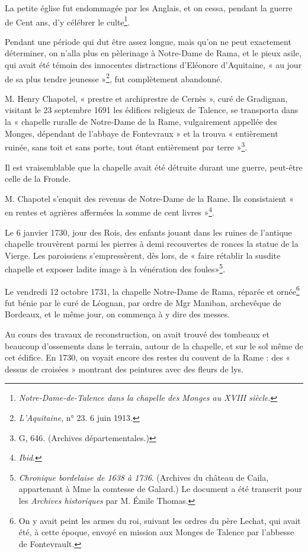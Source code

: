 La petite église fut endommagée par les Anglais, et on cessa, pendant la guerre de Cent ans, d'y célébrer le culte\footnote{\textit{Notre-Dame-de-Talence dans la chapelle des Monges au XVIII\ieme{} siècle}.}.

Pendant une période qui dut être assez longue, mais qu'on ne peut exactement déterminer, on n'alla plus en pèlerinage à Notre-Dame de Rama, et le pieux asile, qui avait été témoin des innocentes distractions d'Eléonore d'Aquitaine, « au jour de sa plus tendre jeunesse »\footnote{\textit{L'Aquitaine}, n° 23. 6 juin 1913.}, fut complètement abandonné.

M. Henry Chapotel, « prestre et archiprestre de Cernès », curé de Gradignan, visitant le 23 septembre 1691 les édifices religieux de Talence, se transporta dans la « chapelle ruralle de Notre-Dame de la Rame, vulgairement appellée des Monges, dépendant de l'abbaye de Fontevraux » et la trouva « entièrement ruinée, sans toit et sans porte, tout étant entièrement par terre »\footnote{G, 646. (Archives départementales.)}.

Il est vraisemblable que la chapelle avait été détruite durant une guerre, peut-être celle de la Fronde.

M. Chapotel s'enquit des revenus de Notre-Dame de la Rame. Ils consistaient « en rentes et agrières affermées la somme de cent livres »\footnote{\textit{Ibid}.}.

Le 6 janvier 1730, jour des Rois, des enfants jouant dans les ruines de l'antique chapelle trouvèrent parmi les pierres à demi recouvertes de ronces la statue de la Vierge. Les paroissiens s'empressèrent, dès lors, de « faire rétablir la susdite chapelle et exposer ladite image à la vénération des foules»\footnote{\textit{Chronique bordelaise de 1638 à 1736}. (Archives du château de Caila, appartenant à Mme la comtesse de Galard.) Le document a été transcrit pour les \textit{Archives historiques} par M. Émile Thomas.}.

Le vendredi 12 octobre 1731, la chapelle Notre-Dame de Rama, réparée et ornée\footnote{On y avait peint les armes du roi, suivant les ordres du père Lechat, qui avait été, à cette époque, envoyé en mission aux Monges de Talence par l'abbesse de Fontevrault.} fut bénie par le curé de Léognan, par ordre de Mgr Maniban, archevêque de Bordeaux, et le même jour, on commença à y dire des messes.

Au cours des travaux de reconstruction, on avait trouvé des tombeaux et beaucoup d'ossements dans le terrain, autour de la chapelle, et sur le sol même de cet édifice. En 1730, on voyait encore des restes du couvent de la Rame : des « dessus de croisées » montrant des peintures avec des fleurs de lys.

